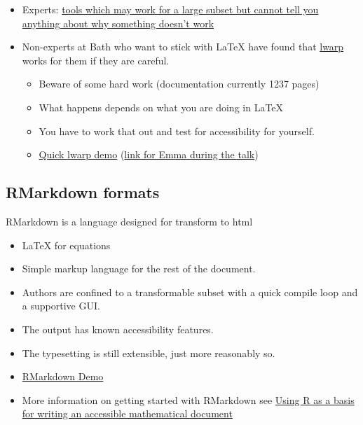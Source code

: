 \documentclass[
  17pt,
  a4paper]{extarticle}
\providecommand{\tightlist}{%
  \setlength{\itemsep}{0pt}\setlength{\parskip}{0pt}}
\theoremstyle{plain}
\theoremstyle{plain}
\theoremstyle{plain}
\theoremstyle{plain}
\theoremstyle{plain}
\theoremstyle{definition}
\theoremstyle{definition}
\theoremstyle{definition}
\theoremstyle{remark}
\renewcommand{\;}{\,}
\begin{document}
\begin{itemize}
\tightlist
\item
  Experts: \href{https://hub.docker.com/r/bathmash/mathaltnotes}{tools which may work for a large subset but cannot tell you anything about why something doesn't work}
\item
  Non-experts at Bath who want to stick with LaTeX have found that \href{https://ctan.org/pkg/lwarp?lang=en}{lwarp} works for them if they are careful.

  \begin{itemize}
  \tightlist
  \item
    Beware of some hard work (documentation currently 1237 pages)
  \item
    What happens depends on what you are doing in LaTeX
  \item
    You have to work that out and test for accessibility for yourself.
  \item
    \href{LINK}{Quick lwarp demo} (\href{https://posit.cloud/content/5641574}{link for Emma during the talk})
  \end{itemize}
\end{itemize}

\hypertarget{rmarkdown-formats}{%
\subsection{RMarkdown formats}\label{rmarkdown-formats}}

RMarkdown is a language designed for transform to html

\begin{itemize}
\tightlist
\item
  LaTeX for equations
\item
  Simple markup language for the rest of the document.
\item
  Authors are confined to a transformable subset with a quick compile loop and a supportive GUI.
\item
  The output has known accessibility features.
\item
  The typesetting is still extensible, just more reasonably so.
\item
  \href{}{RMarkdown Demo}
\item
  More information on getting started with RMarkdown see \href{https://stem-enable.github.io/RMarkdownWorkshop/}{Using R as a basis for writing an accessible mathematical document}
\end{itemize}
\end{document}
